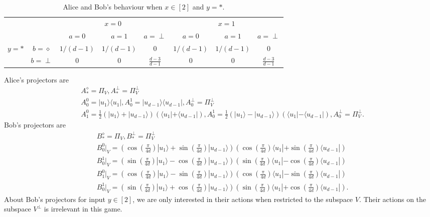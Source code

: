 \documentclass[11pt,letterpaper]{article}
\newcommand{\ket}[1]{|#1\rangle}
\newcommand{\bra}[1]{\langle#1|}
\newcommand{\ketbra}[2]{|#1\rangle\langle#2|}
\newcommand{\1}{\mathbb{1}}
\theoremstyle{definition}
\begin{document}
\begin{table}[H]
\begin{center}
\begin{tabular}{|c|c||c|c|c|c|c|c|}
\hline
\multicolumn{2}{|c|}{} &
\multicolumn{3}{|c|}{$x=0$}&
\multicolumn{3}{|c|}{$x=1$} \\
\cline{3-8}
\multicolumn{2}{|c|}{} &
$a = 0$ & $a=1$ & $a=\perp$ &
$a = 0$ & $a=1$ & $a=\perp$\\
\hline
\hline
\multirow{2}{*}{$y = \ast$} & $b=\diamond$ & $1/(d-1)$ & $1/(d-1)$ & 0 
& $1/(d-1)$ & $1/(d-1)$ & 0 \\
\cline{2-8}
&$b=\perp$ & 0 & 0 & $\frac{d-3}{d-1}$ 
&  0 & 0 & \small $\frac{d-3}{d-1} $  \\
\hline
\end{tabular}
\end{center}
\caption{Alice and Bob's behaviour when $x\in [2]$ and $y = \ast$.}
\end{table}
Alice's projectors are 
\begin{align*}
	&A_\ast^\diamond = \Pi_V, A_\ast^\perp = \Pi_V^\perp \\
	&A_0^0 = \ketbra{u_1}{u_1}, A_0^1 = \ketbra{u_{d-1}}{u_{d-1}}, A_0^\perp = \Pi_V^\perp\\
	&A_1^0 = \frac{1}{2}(\ket{u_1}+\ket{u_{d-1}})(\bra{u_1}+\bra{u_{d-1}}), 
	A_0^1 = \frac{1}{2}(\ket{u_1}-\ket{u_{d-1}})(\bra{u_1}-\bra{u_{d-1}}),A_0^\perp = \Pi_V^\perp.
\end{align*}
Bob's projectors are 
\begin{align*}
	&B_\ast^\diamond = \Pi_V, B_\ast^\perp = \Pi_V^\perp \\
	&B_0^0|_V = \left( \cos(\frac{\pi}{4d})\ket{u_1} + \sin(\frac{\pi}{4d})\ket{u_{d-1}}\right)
	\left( \cos(\frac{\pi}{4d})\bra{u_1} + \sin(\frac{\pi}{4d})\bra{u_{d-1}}\right)\\
	&B_0^1|_V = \left( \sin(\frac{\pi}{4d})\ket{u_1} - \cos(\frac{\pi}{4d})\ket{u_{d-1}}\right)
	\left( \sin(\frac{\pi}{4d})\bra{u_1} - \cos(\frac{\pi}{4d})\bra{u_{d-1}}\right)\\
	&B_1^0|_V = \left( \cos(\frac{\pi}{4d})\ket{u_1} - \sin(\frac{\pi}{4d})\ket{u_{d-1}}\right)
	\left( \cos(\frac{\pi}{4d})\bra{u_1} - \sin(\frac{\pi}{4d})\bra{u_{d-1}}\right)\\
	&B_0^1|_V = \left( \sin(\frac{\pi}{4d})\ket{u_1} + \cos(\frac{\pi}{4d})\ket{u_{d-1}}\right)
	\left( \sin(\frac{\pi}{4d})\bra{u_1} + \cos(\frac{\pi}{4d})\bra{u_{d-1}}\right).
\end{align*}
About Bob's projectors for input $y \in [2]$, we are only interested in their actions when restricted 
to the subspace $V$. Their actions on the subspace $V^\perp$ is irrelevant in this game.
\end{document}
